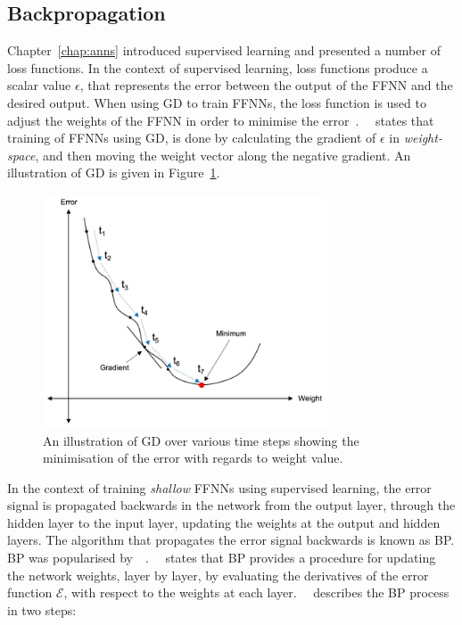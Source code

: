 \subsection{Backpropagation}\label{sec:heuristics:gd:backpropagation}

Chapter~\ref{chap:anns} introduced supervised learning and presented a number of loss functions. In the context of supervised learning, loss functions produce a scalar value $\epsilon$, that represents the error between the output of the \acs{FFNN} and the desired output. When using \acs{GD} to train \acp{FFNN}, the loss function is used to adjust the weights of the \acs{FFNN} in order to minimise the error~\cite{ref:engelbrecht:2007}.~\citeauthor{ref:engelbrecht:2007}~\cite{ref:engelbrecht:2007} states that training of \acp{FFNN} using \acs{GD}, is done by calculating the gradient of $\epsilon$ in \textit{weight-space}, and then moving the weight vector along the negative gradient. An illustration of \acs{GD} is given in Figure~\ref{fig:heuristics:gd:gd_illustration}.

\begin{figure}[htbp]
	\centering
	\includegraphics[width=0.75\textwidth]{images/gradient_descent.pdf}
	\caption{An illustration of \acf{GD} over various time steps showing the minimisation of the error with regards to weight value.}
	\label{fig:heuristics:gd:gd_illustration}
\end{figure}

In the context of training \textit{shallow} \acp{FFNN} using supervised learning, the error signal is propagated backwards in the network from the output layer, through the hidden layer to the input layer, updating the weights at the output and hidden layers. The algorithm that propagates the error signal backwards is known as \acf{BP}. \Acs{BP} was popularised by~\citeauthor{ref:werbos:1994}~\cite{ref:werbos:1994}.~\citeauthor{ref:nel:2021}~\cite{ref:nel:2021} states that \acs{BP} provides a procedure for updating the network weights, layer by layer, by evaluating the derivatives of the error function $\mathcal{E}$, with respect to the weights at each layer.~\citeauthor{ref:engelbrecht:2007}~\cite{ref:engelbrecht:2007} describes the \acs{BP} process in two steps:

